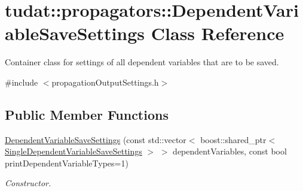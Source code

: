 \hypertarget{classtudat_1_1propagators_1_1DependentVariableSaveSettings}{}\section{tudat\+:\+:propagators\+:\+:Dependent\+Variable\+Save\+Settings Class Reference}
\label{classtudat_1_1propagators_1_1DependentVariableSaveSettings}


Container class for settings of all dependent variables that are to be saved.  




{\ttfamily \#include $<$propagation\+Output\+Settings.\+h$>$}

\subsection*{Public Member Functions}
\begin{DoxyCompactItemize}
\item 
\hyperlink{classtudat_1_1propagators_1_1DependentVariableSaveSettings_aee4b7fd21d5ae69536cba2f377c0d4bb}{Dependent\+Variable\+Save\+Settings} (const std\+::vector$<$ boost\+::shared\+\_\+ptr$<$ \hyperlink{classtudat_1_1propagators_1_1SingleDependentVariableSaveSettings}{Single\+Dependent\+Variable\+Save\+Settings} $>$ $>$ dependent\+Variables, const bool print\+Dependent\+Variable\+Types=1)
\begin{DoxyCompactList}\small\item\em Constructor. \end{DoxyCompactList}\end{DoxyCompactItemize}
